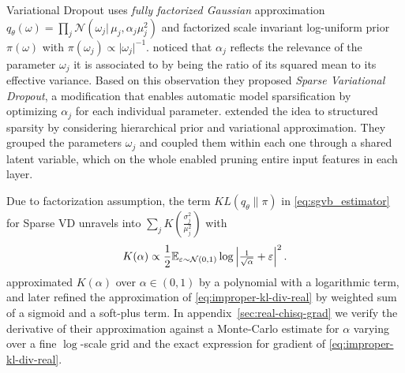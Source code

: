 \documentclass{article}
\begin{document}
Variational Dropout uses \emph{fully factorized Gaussian} approximation $
  q_\theta(\omega)
    = \prod_j \mathcal{N}(\omega_j \vert\, \mu_j, \alpha_j \mu_j^2)
$ and factorized scale invariant log-uniform prior $\pi(\omega)$ with $
  \pi(\omega_j) \propto \lvert \omega_j \rvert^{-1}
$. \citet{molchanov_variational_2017} noticed that $\alpha_j$ reflects the relevance of the
parameter $\omega_j$ it is associated to by being the ratio of its squared mean to its
effective variance. Based on this observation they proposed \emph{Sparse Variational Dropout},
a modification that enables automatic model sparsification by optimizing $\alpha_j$ for each
individual parameter. \citet{louizos_bayesian_2017} extended the idea to structured sparsity
by considering hierarchical prior and variational approximation. They grouped the parameters
$\omega_j$ and coupled them within each one through a shared latent variable, which on the
whole enabled pruning entire input features in each layer.

Due to factorization assumption, the term $KL(q_\theta \| \pi)$ in \eqref{eq:sgvb_estimator}
for Sparse VD unravels into $
  \sum_j K(\tfrac{\sigma^2_{j}}{\mu_{j}^2})
$ with
\begin{equation}  \label{eq:improper-kl-div-real}
  K(\alpha)
    \propto \frac12 \mathbb{E}_{\varepsilon \sim \mathcal{N}(0, 1)}
        \log{\Bigl\lvert \tfrac1{\sqrt{\alpha}} + \varepsilon \Bigr\rvert^2}
  \,.
\end{equation}
\citet{kingma_variational_2015} approximated $K(\alpha)$ over $\alpha \in (0, 1)$ by a
polynomial with a logarithmic term, and later \citet{molchanov_variational_2017} refined
the approximation of \eqref{eq:improper-kl-div-real} by weighted sum of a sigmoid and a
soft-plus term.
In appendix~\ref{sec:real-chisq-grad} we verify the derivative of their approximation
against a Monte-Carlo estimate for $\alpha$ varying over a fine $\log$-scale grid and
the exact expression for gradient of \eqref{eq:improper-kl-div-real}.
\end{document}
